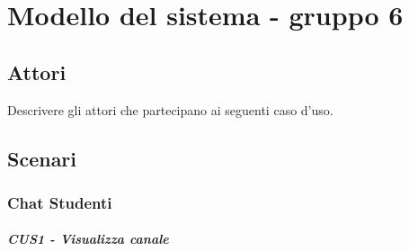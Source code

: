 
\chapter{Modello del sistema - gruppo 6}
\label{ref:modSistemaGruppo6}


\section{Attori}
Descrivere gli attori che partecipano ai seguenti caso d'uso.


\section{Scenari}
\subsection{Chat Studenti}
\paragraph{CUS1 - Visualizza canale}

